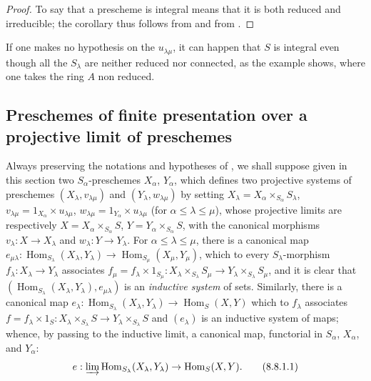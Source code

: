 \begin{proof}
To say that a prescheme is integral means that it is both reduced and irreducible; the corollary thus follows from  and from .
\end{proof}

\begin{remark}[8.7.4]
\label{IV.8.7.4}
If one makes no hypothesis on the $u_{\lambda\mu}$, it can happen that $S$ is integral even though all the $S_\lambda$ are neither reduced nor connected, as the example  shows, where one takes the ring $A$ non reduced.
\end{remark}

\subsection{Preschemes of finite presentation over a projective limit of preschemes}
\label{subsection:IV.8.8}

\begin{env}[8.8.1]
\label{IV.8.8.1}
Always preserving the notations and hypotheses of , we shall suppose given in this section two $S_\alpha$-preschemes $X_\alpha$, $Y_\alpha$, which defines  two projective systems of preschemes $(X_\lambda,v_{\lambda\mu})$ and $(Y_\lambda,w_{\lambda\mu})$ by setting $X_\lambda=X_\alpha\times_{S_\alpha}S_\lambda$, $v_{\lambda\mu}=1_{X_\alpha}\times u_{\lambda\mu}$, $w_{\lambda\mu}=1_{Y_\alpha}\times u_{\lambda\mu}$ (for $\alpha\leqslant\lambda\leqslant\mu$), whose projective limits are respectively $X=X_\alpha\times_{S_\alpha}S$, $Y=Y_\alpha\times_{S_\alpha}S$, with the canonical morphisms $v_\lambda:X\to X_\lambda$ and $w_\lambda:Y\to Y_\lambda$.
For $\alpha\leqslant\lambda\leqslant\mu$, there is a canonical map $e_{\mu\lambda}:\operatorname{Hom}_{S_\lambda}(X_\lambda,Y_\lambda)\to\operatorname{Hom}_{S_\mu}(X_\mu,Y_\mu)$, which to every $S_\lambda$-morphism $f_\lambda:X_\lambda\to Y_\lambda$ associates $f_\mu=f_\lambda\times 1_{S_\mu}:X_\lambda\times_{S_\lambda}S_\mu\to Y_\lambda\times_{S_\lambda}S_\mu$, and it is clear that $(\operatorname{Hom}_{S_\lambda}(X_\lambda,Y_\lambda),e_{\mu\lambda})$ is an \emph{inductive system} of sets.
Similarly, there is a canonical map $e_\lambda:\operatorname{Hom}_{S_\lambda}(X_\lambda,Y_\lambda)\to\operatorname{Hom}_S(X,Y)$ which to $f_\lambda$ associates $f=f_\lambda\times 1_S:X_\lambda\times_{S_\lambda}S\to Y_\lambda\times_{S_\lambda}S$ and $(e_\lambda)$ is an inductive system of maps; whence, by passing to the inductive limit, a canonical map, functorial in $S_\alpha$, $X_\alpha$, and $Y_\alpha$:
\[
  e:\varinjlim\operatorname{Hom}_{S_\lambda}(X_\lambda,Y_\lambda)\to\operatorname{Hom}_S(X,Y).
  \tag{8.8.1.1}\label{IV.8.8.1.1}
\]
\end{env}

